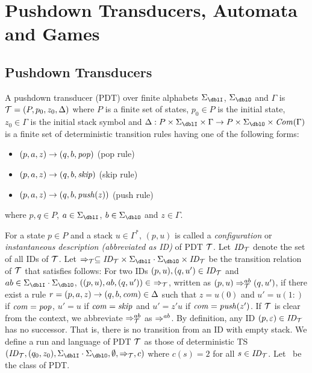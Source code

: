 \section{Pushdown Transducers, Automata and Games}
\subsection{Pushdown Transducers}
\begin{definition}
A {pushdown transducer} (PDT)
over finite alphabets $\Sigma_\dblI$, $\Sigma_\dblO$ and $\Gamma$
is ${\cal T}=(P, p_0, z_0, \Delta)$ where
$P$ is a finite set of states,
$p_0\in P$ is the initial state,
$z_0\in \Gamma$ is the initial stack symbol and
$\Delta: P\times \Sigma_\dblI \times \Gamma \to P\times \Sigma_\dblO \times \Com(\Gamma)$ is a finite set of deterministic transition rules having one of the following forms:
\begin{itemize}
\item $(p, a, z) \rightarrow (q, b, \mathit{pop})$ \quad (pop rule)
\item $(p, a, z) \rightarrow (q, b, \mathit{skip})$ \quad (skip rule)
\item $(p, a, z) \rightarrow (q, b, \mathit{push}(z))$ \quad (push rule)
\end{itemize}
where $p, q\in P$, $a\in\Sigma_\dblI$, $b\in\Sigma_\dblO$ and $z\in\Gamma$.
\end{definition}
\noindent
For a state $p\in P$ and
a stack $u \in \Gamma^*$,
$(p, u)$ is called
a {\em configuration} or {\em instantaneous description (abbreviated as ID)} of PDT ${\cal T}$. Let $\mathit{ID}_{\cal T}$ denote the set of all IDs of ${\cal T}$.
Let $\Rightarrow_\calT\subseteq \ID_\calT\times \Sigma_\dblI\cdot\Sigma_\dblO\times \ID_\calT$ be the transition relation of ${\cal T}$ that satisfies follows:
For two IDs $(p, u), (q, u')\in \mathit{ID}_{\cal T}$ and $ab\in\Sigma_\dblI\cdot \Sigma_\dblO$,
$((p, u), ab, (q, u'))\in\ \Rightarrow_{\cal T}$,
written as $(p, u) \Rightarrow_{{\cal T}}^{ab} (q, u')$,
if there exist a rule $r=(p, a, z) \rightarrow (q, b, \mathit{com}) \in \Delta$
such that $z=u(0)$ and $u'={u(1:)}$ if $\mathit{com}=\mathit{pop}$, $u'=u$ if $\mathit{com}=\mathit{skip}$ and $u'=z'u$ if $\mathit{com}=\mathit{push}(z')$.
If ${\cal T}$ is clear from the context,
we abbreviate
$\Rightarrow_{{\cal T}}^{ab}$ as $\Rightarrow^{ab}$.
By definition, any ID $(p, \varepsilon)\in\mathit{ID}_{{\cal T}}$ has
no successor.
That is, there is no transition from an ID with empty stack.
We define a run and language of PDT ${\cal T}$ as those of
deterministic TS $(\ID_\calT, (q_0,z_0), \Sigma_\dblI\cdot\Sigma_\dblO, \emptyset, \Rightarrow_\calT, c)$ where $c(s)=2$ for all $s\in\mathit{ID}_{\cal T}$.
Let \PDT\ be the class of PDT.

